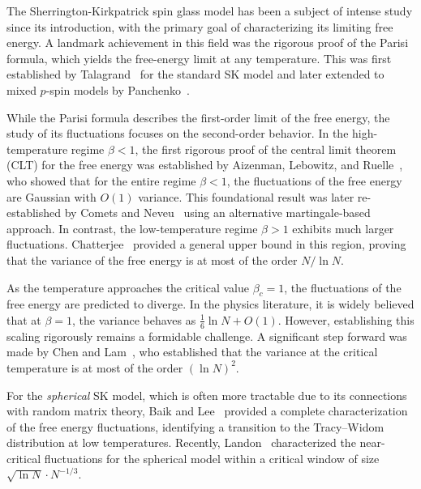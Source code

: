 \documentclass[letterpaper,11pt,reqno]{amsart}
\begin{document}
The Sherrington-Kirkpatrick spin glass model has been a subject of intense study since its introduction, with the primary goal of characterizing its limiting free energy. A landmark achievement in this field was the rigorous proof of the Parisi formula, which yields the free-energy limit at any temperature. This was first established by Talagrand~\cite{Tal06} for the standard SK model and later extended to mixed $p$-spin models by Panchenko~\cite{Pan14}.

While the Parisi formula describes the first-order limit of the free energy, the study of its fluctuations focuses on the second-order behavior. In the high-temperature regime $\beta < 1$, the first rigorous proof of the central limit theorem (CLT) for the free energy was established by Aizenman, Lebowitz, and Ruelle~\cite{ALR87}, who showed that for the entire regime $\beta < 1$, the fluctuations of the free energy are Gaussian with $O(1)$ variance. This foundational result was later re-established by Comets and Neveu~\cite{CN95} using an alternative martingale-based approach. In contrast, the low-temperature regime $\beta > 1$ exhibits much larger fluctuations. Chatterjee~\cite{Cha09} provided a general upper bound in this region, proving that the variance of the free energy is at most of the order $N/\ln N$.

As the temperature approaches the critical value $\beta_c = 1$, the fluctuations of the free energy are predicted to diverge. In the physics literature, it is widely believed that at $\beta = 1$, the variance behaves as $\frac{1}{6} \ln N +O(1)$. However, establishing this scaling rigorously remains a formidable challenge. A significant step forward was made by Chen and Lam~\cite{CL19}, who established that the variance at the critical temperature is at most of the order $(\ln N)^2$.

For the \textit{spherical} SK model, which is often more tractable due to its connections with random matrix theory, Baik and Lee~\cite{BL16} provided a complete characterization of the free energy fluctuations, identifying a transition to the Tracy--Widom distribution at low temperatures. Recently, Landon~\cite{Lan22} characterized the near-critical fluctuations for the spherical model within a critical window of size $\sqrt{\ln N} \cdot N^{-1/3}$.
\end{document}
